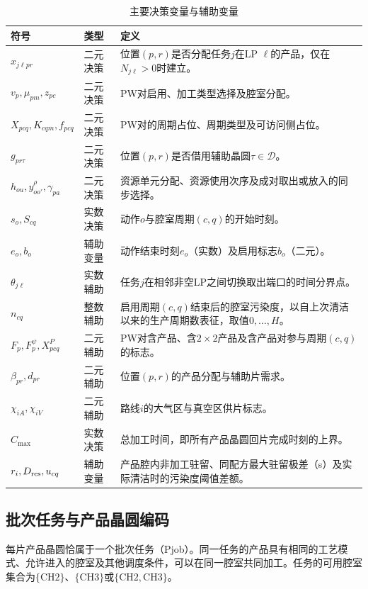 \documentclass[final,5p,times,twocolumn]{elsarticle}
\begin{document}
\begin{table}[t]
\centering\small
\caption{主要决策变量与辅助变量}
\label{tab:symbol-cn-b}
\renewcommand{\arraystretch}{1.05}
\setlength{\tabcolsep}{4pt}
\begin{tabular}{@{}C{0.20\textwidth}C{0.16\textwidth}C{\textwidth-16pt\relax}@{}}
\toprule
符号 & 类型 & 定义\\\midrule
$x_{j\ell pr}$ & 二元决策 & 位置$(p,r)$是否分配任务$j$在LP $\ell$的产品，仅在$N_{j\ell}>0$时建立。\\
$v_p,\mu_{pm},z_{pc}$ & 二元决策 & PW对启用、加工类型选择及腔室分配。\\
$X_{pcq},K_{cqm},f_{pcq}$ & 二元决策 & PW对的周期占位、周期类型及可访问侧占位。\\
$g_{pr\tau}$ & 二元决策 & 位置$(p,r)$是否借用辅助晶圆$\tau\in\mathcal D$。\\
$h_{ou},y^\rho_{oo'},\gamma_{pa}$ & 二元决策 & 资源单元分配、资源使用次序及成对取出或放入的同步选择。\\
$s_o,S_{cq}$ & 实数决策 & 动作$o$与腔室周期$(c,q)$的开始时刻。\\
$e_o,b_o$ & 辅助变量 & 动作结束时刻$e_o$（实数）及启用标志$b_o$（二元）。\\
$\theta_{j\ell}$ & 实数辅助 & 任务$j$在相邻非空LP之间切换取出端口的时间分界点。\\
$n_{cq}$ & 整数辅助 & 启用周期$(c,q)$结束后的腔室污染度，以自上次清洁以来的生产周期数表征，取值$0,\ldots,H$。\\
$F_p,F_p^\psi,X^P_{pcq}$ & 二元辅助 & PW对含产品、含$2\times2$产品及含产品对参与周期$(c,q)$的标志。\\
$\beta_{pr},d_{pr}$ & 二元辅助 & 位置$(p,r)$的产品分配与辅助片需求。\\
$\chi_{iA},\chi_{iV}$ & 二元辅助 & 路线$i$的大气区与真空区供片标志。\\
$C_{\max}$ & 实数决策 & 总加工时间，即所有产品晶圆回片完成时刻的上界。\\
$r_i,D_{\rm res},u_{cq}$ & 辅助变量 & 产品腔内非加工驻留、同配方最大驻留极差（s）及实际清洁时的污染度阈值差额。\\
\bottomrule
\end{tabular}
\end{table}

\subsection{批次任务与产品晶圆编码}
\label{sec:model-encoding-cn}

每片产品晶圆恰属于一个批次任务（Pjob）。同一任务的产品具有相同的工艺模式、允许进入的腔室及其他调度条件，可以在同一腔室共同加工。任务的可用腔室集合为$\{\mathrm{CH2}\}$、$\{\mathrm{CH3}\}$或$\{\mathrm{CH2},\mathrm{CH3}\}$。
\end{document}
